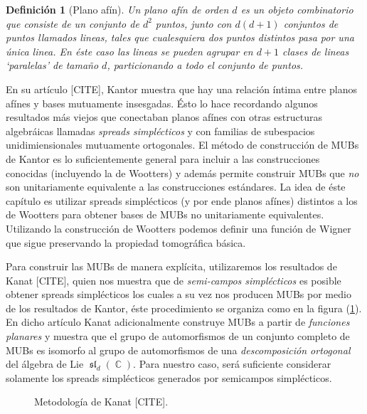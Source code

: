 \documentclass[a4paper]{report}
\DeclareMathOperator{\C}{\mathbb{C}}
\DeclareMathOperator{\Sl}{\mathfrak{sl}}
\newtheorem{definition}{Definición}
\begin{document}
  \begin{definition}[Plano afín]
    Un plano afín de orden $d$ es un objeto combinatorio que
    consiste de un conjunto de $d^2$ puntos, junto con
    $d(d+1)$ conjuntos de puntos llamados \textit{lineas},
    tales que cualesquiera dos puntos distintos pasa por una
    única linea. En éste caso las lineas se pueden agrupar
    en $d+1$ clases de lineas `paralelas' de tamaño $d$,
    particionando a todo el conjunto de puntos. 
  \end{definition}

  En su artículo [CITE], Kantor muestra que hay una relación
  íntima entre planos afínes y bases mutuamente insesgadas.
  Ésto lo hace recordando algunos resultados más viejos que
  conectaban planos afínes con otras estructuras algebráicas
  llamadas \textit{spreads simplécticos} y con familias de
  subespacios unidimiensionales mutuamente ortogonales.  El
  método de construcción de MUBs de Kantor es lo
  suficientemente general para incluir a las construcciones
  conocidas (incluyendo la de Wootters) y además permite
  construir MUBs que \textit{no} son unitariamente
  equivalente a las construcciones estándares. La idea de
  éste capítulo es utilizar spreads simplécticos (y por ende
  planos afínes) distintos a los de Wootters para obtener
  bases de MUBs no unitariamente equivalentes. Utilizando la
  construcción de Wootters podemos definir una función de
  Wigner que sigue preservando la propiedad tomográfica
  básica. 

  Para construir las MUBs de manera explícita, utilizaremos
  los resultados de Kanat [CITE], quien nos muestra que de
  \textit{semi-campos simplécticos} es posible obtener
  spreads simplécticos los cuales a su vez nos producen MUBs
  por medio de los resultados de Kantor, éste procedimiento
  se organiza como en la figura (\ref{diag:kanat}).  En
  dicho artículo Kanat adicionalmente construye MUBs a
  partir de \textit{funciones planares} y muestra que el
  grupo de automorfismos de un conjunto completo de MUBs es
  isomorfo al grupo de automorfismos de una
  \textit{descomposición ortogonal} del álgebra de Lie
  $\Sl_d(\C)$. Para nuestro caso, será suficiente considerar
  solamente los spreads simplécticos generados por
  semicampos simplécticos.

  \begin{figure}[h]
    \centering
    \caption{Metodología de Kanat [CITE].}
    \label{diag:kanat}
  \end{figure}
\end{document}
